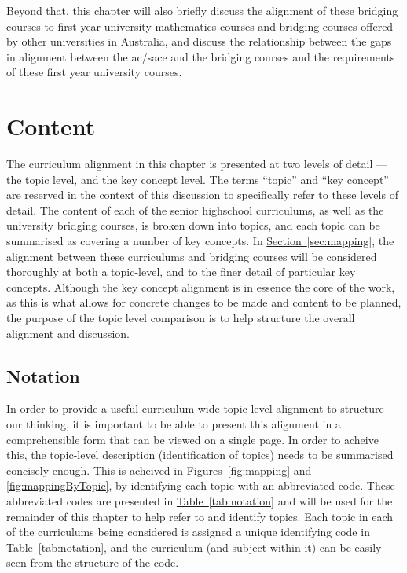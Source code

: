 \documentclass[twoside,12pt,a4paper]{report}
\newcommand{\refsec}[1]{\hyperref[sec:#1]{Section~\ref{sec:#1}}}
\newcommand{\reftab}[1]{\hyperref[tab:#1]{Table~\ref{tab:#1}}}
\begin{document}
Beyond that, this chapter will also briefly discuss the alignment of these bridging courses to first year university mathematics courses and bridging courses offered by other universities in Australia, and discuss the relationship between the gaps in alignment between the \gls{ac}/\gls{sace} and the bridging courses and the requirements of these first year university courses. 



\section{Content}
\label{sec:content}

The curriculum alignment in this chapter is presented at two levels of detail --- the topic level, and the key concept level. The terms ``topic'' and ``key concept'' are reserved in the context of this discussion to specifically refer to these levels of detail. The content of each of the senior highschool curriculums, as well as the university bridging courses, is broken down into topics, and each topic can be summarised as covering a number of key concepts. In \refsec{mapping}, the alignment between these curriculums and bridging courses will be considered thoroughly at both a topic-level, and to the finer detail of particular key concepts. Although the key concept alignment is in essence the core of the work, as this is what allows for concrete changes to be made and content to be planned, the purpose of the topic level comparison is to help structure the overall alignment and discussion. 

\subsection{Notation}

In order to provide a useful curriculum-wide topic-level alignment to structure our thinking, it is important to be able to present this alignment in a comprehensible form that can be viewed on a single page. In order to acheive this, the topic-level description (identification of topics) needs to be summarised concisely enough. This is acheived in Figures~\ref{fig:mapping} and \ref{fig:mappingByTopic}, by identifying each topic with an abbreviated code. These abbreviated codes are presented in \reftab{notation} and will be used for the remainder of this chapter to help refer to and identify topics. Each topic in each of the curriculums being considered is assigned a unique identifying code in \reftab{notation}, and the curriculum (and subject within it) can be easily seen from the structure of the code.
\end{document}
